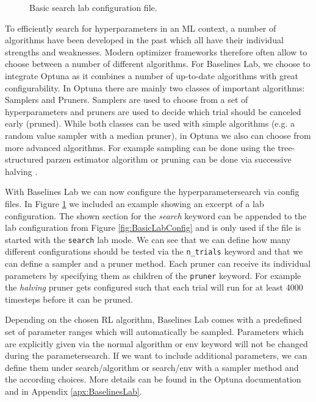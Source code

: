 \begin{figure}[ht]
    
    \caption{Basic search lab configuration file.}
    \label{fig:BasicSearchConfig}
\end{figure}

To efficiently search for hyperparameters in an ML context, a number of algorithms have been developed in the past which all have their individual strengths and weaknesses. Modern optimizer frameworks therefore often allow to choose between a number of different algorithms. For Baselines Lab, we choose to integrate Optuna \cite{akiba2019optuna} as it combines a number of up-to-date algorithms with great configurability. In Optuna there are mainly two classes of important algorithms: Samplers and Pruners. Samplers are used to choose from a set of hyperparameters and pruners are used to decide which trial should be canceled early (pruned). While both classes can be used with simple algorithms (e.g. a random value sampler with a median pruner), in Optuna we also can choose from more advanced algorithms. For example sampling can be done using the tree-structured parzen estimator algorithm \cite{bergstra2011algorithms} or pruning can be done via successive halving \cite{karnin2013almost}.

With Baselines Lab we can now configure the hyperparametersearch via config files. In Figure \ref{fig:BasicSearchConfig} we included an example showing an excerpt of a lab configuration. The shown section for the \textit{search} keyword can be appended to the lab configuration from Figure \ref{fig:BasicLabConfig} and is only used if the file is started with the \texttt{search} lab mode. We can see that we can define how many different configurations should be tested via the \texttt{n\_trials} keyword and that we can define a sampler and a pruner method. Each pruner can receive its individual parameters by specifying them as children of the \texttt{pruner} keyword. For example the \textit{halving} pruner gets configured such that each trial will run for at least 4000 timesteps before it can be pruned.

Depending on the chosen RL algorithm, Baselines Lab comes with a predefined set of parameter ranges which will automatically be sampled. Parameters which are explicitly given via the normal algorithm or env keyword will not be changed during the parametersearch. If we want to include additional parameters, we can define them under search/algorithm or search/env with a sampler method and the according choices. More details can be found in the Optuna documentation \cite{optuna-docs} and in Appendix \ref{apx:BaselinesLab}.

